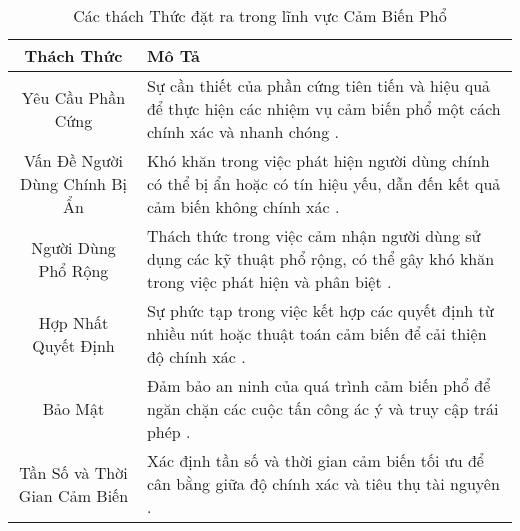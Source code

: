 \begin{table}[h!]
    \centering
    \begin{tabular}{c|p{8cm}}
        \hline
        \hline
        \textbf{Thách Thức} & \textbf{Mô Tả} \\
        \hline
        Yêu Cầu Phần Cứng & Sự cần thiết của phần cứng tiên tiến và hiệu quả để thực hiện các nhiệm vụ cảm biến phổ một cách chính xác và nhanh chóng \cite{YucekSpectrumSensing}. \\
        \hline
        Vấn Đề Người Dùng Chính Bị Ẩn & Khó khăn trong việc phát hiện người dùng chính có thể bị ẩn hoặc có tín hiệu yếu, dẫn đến kết quả cảm biến không chính xác \cite{YucekSpectrumSensing}. \\
        \hline
        Người Dùng Phổ Rộng & Thách thức trong việc cảm nhận người dùng sử dụng các kỹ thuật phổ rộng, có thể gây khó khăn trong việc phát hiện và phân biệt \cite{YucekSpectrumSensing}. \\
        \hline
        Hợp Nhất Quyết Định & Sự phức tạp trong việc kết hợp các quyết định từ nhiều nút hoặc thuật toán cảm biến để cải thiện độ chính xác \cite{YucekSpectrumSensing}. \\
        \hline
        Bảo Mật & Đảm bảo an ninh của quá trình cảm biến phổ để ngăn chặn các cuộc tấn công ác ý và truy cập trái phép \cite{YucekSpectrumSensing}. \\
        \hline
        Tần Số và Thời Gian Cảm Biến & Xác định tần số và thời gian cảm biến tối ưu để cân bằng giữa độ chính xác và tiêu thụ tài nguyên \cite{YucekSpectrumSensing}. \\
        \hline
        \hline
    \end{tabular}
    \caption{Các thách Thức đặt ra trong lĩnh vực Cảm Biến Phổ}
    \label{table:challenges}
\end{table}

